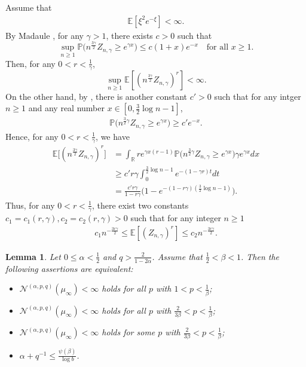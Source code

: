 \documentclass[12pt]{amsart}
\newtheorem{lemma}[theorem]{Lemma}
\theoremstyle{definition}
\theoremstyle{remark}
\newcommand{\R}{\mathbb{R}}
\newcommand{\E}{\mathbb{E}}
\newcommand{\PP}{\mathbb{P}}
\newcommand{\NQ}{\mathcal{N}^{(\alpha, p, q)}}
\numberwithin{equation}{section}
\begin{document}
Assume that  
\begin{align}\label{xi-ass}
\E[\xi^2 e^{-\xi}]<\infty. 
\end{align}
By Madaule \cite[Proposition 2.1]{Mad}, for any $\gamma>1$,  there exists $c>0$ such that 
\[
\sup_{n\ge 1}\PP\big( n^{\frac{3\gamma}{2}} Z_{n, \gamma} \ge e^{\gamma x}\big) \le c (1+x) e^{-x} \quad \text{for all $x\ge1$}. 
\]
Then,   for any $0< r<\frac{1}{\gamma}$, 
\[
\sup_{n\ge 1}\E[(n^{\frac{3\gamma}{2}} Z_{n, \gamma})^r]<\infty. 
\]
On the other hand,  by \cite[Lemma~3.6]{Elie-AOP}, there is another constant $c'>0$ such that for any intger $n\geq 1$ and any real number $x\in [0,\frac{3}{2}\log n-1]$, 
\begin{align*}
\PP\big(n^{\frac{3}{2}\gamma}Z_{n,\gamma}\ge e^{\gamma x}\big)\ge  c'e^{-x}. 
\end{align*}
Hence, for any $0< r<\frac{1}{\gamma}$, we have
\begin{align*}
\E\big[(n^{\frac{3\gamma}{2}} Z_{n, \gamma})^r\big]&=\int_{\R}r e^{\gamma x(r-1)}\PP\big(n^{\frac{3}{2}\gamma}Z_{n,\gamma}\ge e^{\gamma x}\big)\gamma e^{\gamma x}dx\\
&\ge c'r\gamma \int_{0}^{\frac{3}{2}\log n-1}  e^{-(1-\gamma r)t} dt\\
&=\frac{c'r\gamma}{1- r\gamma}\big(1-e^{-(1-r\gamma)(\frac{3}{2}\log n-1)}\big).
\end{align*}
Thus,  for any $0< r<\frac{1}{\gamma}$, there exist two constants $c_1 = c_1(r, \gamma), c_2 = c_2(r, \gamma)>0$ such that for any integer $n \ge 1$
\begin{align}\label{s-m-asymp}
	c_1 n^{-\frac{3r\gamma}{2}}\le  \E[(Z_{n, \gamma})^r]  \le c_2 n^{-\frac{3r\gamma}{2}}.
\end{align}











\begin{lemma}\label{prop-super}
Let $0\le \alpha<\frac{1}{2}$ and $q>\frac{2}{1-2\alpha}$. Assume that $\frac{1}{2}<\beta<1$.   Then the following assertions are equivalent:
\begin{itemize}
\item[(A1).]$\NQ(\mu_\infty)<\infty$ holds for all $p$ with $1< p< \frac{1}{\beta}$; 
\item[(A2).] $\NQ(\mu_\infty)<\infty$ holds for all $p$ with $\frac{2}{3\beta}< p< \frac{1}{\beta}$; 
\item[(A3).]  $\NQ(\mu_\infty)<\infty$ holds for some $p$ with $\frac{2}{3\beta}<p< \frac{1}{\beta}$; 
\item[(A4).] $\alpha +q^{-1}  \le    \frac{\psi(\beta)}{\log b}$.
\end{itemize}
\end{lemma}
\end{document}
